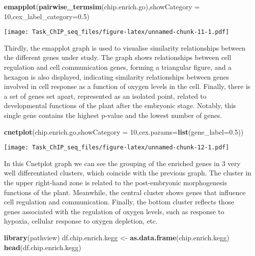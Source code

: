 \documentclass[
]{article}
\newenvironment{Shaded}{\begin{snugshade}}{\end{snugshade}}
\newcommand{\AttributeTok}[1]{\textcolor[rgb]{0.13,0.29,0.53}{#1}}
\newcommand{\DecValTok}[1]{\textcolor[rgb]{0.00,0.00,0.81}{#1}}
\newcommand{\FloatTok}[1]{\textcolor[rgb]{0.00,0.00,0.81}{#1}}
\newcommand{\FunctionTok}[1]{\textcolor[rgb]{0.13,0.29,0.53}{\textbf{#1}}}
\newcommand{\NormalTok}[1]{#1}
\newcommand{\OtherTok}[1]{\textcolor[rgb]{0.56,0.35,0.01}{#1}}
\begin{document}
\begin{Shaded}
\begin{Highlighting}[]
\FunctionTok{emapplot}\NormalTok{(}\FunctionTok{pairwise\_termsim}\NormalTok{(chip.enrich.go),}\AttributeTok{showCategory =} \DecValTok{10}\NormalTok{,}\AttributeTok{cex\_label\_category=}\FloatTok{0.5}\NormalTok{)}
\end{Highlighting}
\end{Shaded}

\texttt{[image: Task\_ChIP\_seq\_files/figure-latex/unnamed-chunk-11-1.pdf]}

Thirdly, the emapplot graph is used to visualise similarity
relationships between the different genes under study. The graph shows
relationships between cell regulation and cell communication genes,
forming a triangular figure, and a hexagon is also displayed, indicating
similarity relationships between genes involved in cell response as a
function of oxygen levels in the cell. Finally, there is a set of genes
set apart, represented as an isolated point, related to developmental
functions of the plant after the embryonic stage. Notably, this single
gene contains the highest p-value and the lowest number of genes.

\begin{Shaded}
\begin{Highlighting}[]
\FunctionTok{cnetplot}\NormalTok{(chip.enrich.go,}\AttributeTok{showCategory =} \DecValTok{10}\NormalTok{,}\AttributeTok{cex.params=}\FunctionTok{list}\NormalTok{(}\AttributeTok{gene\_label=}\FloatTok{0.5}\NormalTok{))}
\end{Highlighting}
\end{Shaded}

\texttt{[image: Task\_ChIP\_seq\_files/figure-latex/unnamed-chunk-12-1.pdf]}

In this Cnetplot graph we can see the grouping of the enriched genes in
3 very well differentiated clusters, which coincide with the previous
graph. The cluster in the upper right-hand zone is related to the
post-embryonic morphogenesis functions of the plant. Meanwhile, the
central cluster shows genes that influence cell regulation and
communication. Finally, the bottom cluster reflects those genes
associated with the regulation of oxygen levels, such as response to
hypoxia, cellular response to oxygen depletion, etc.

\begin{Shaded}
\begin{Highlighting}[]
\FunctionTok{library}\NormalTok{(pathview)}
\NormalTok{df.chip.enrich.kegg }\OtherTok{\textless{}{-}} \FunctionTok{as.data.frame}\NormalTok{(chip.enrich.kegg)}
\FunctionTok{head}\NormalTok{(df.chip.enrich.kegg)}
\end{Highlighting}
\end{Shaded}
\end{document}
